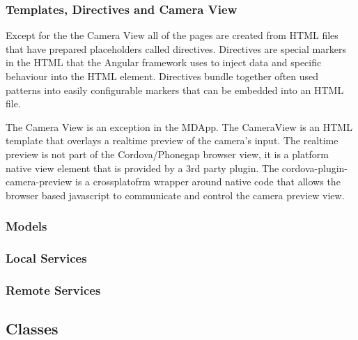 \subsubsection{Templates, Directives and Camera View}
Except for the the Camera View all of the pages are created from HTML files that have prepared placeholders called directives. Directives are special markers in the HTML that the Angular framework uses to inject data and specific behaviour into the HTML element. Directives bundle together often used patterns into easily configurable markers that can be embedded into an HTML file.

The Camera View is an exception in the MDApp. The CameraView is an HTML template that overlays a realtime preview of the camera’s input. The realtime preview is not part of the Cordova/Phonegap browser view, it is a platform native view element that is provided by a 3rd party plugin. The cordova-plugin-camera-preview is a crossplatofrm wrapper around native code that allows the browser based javascript to communicate and control the camera preview view.

\subsubsection{Models}


\subsubsection{Local Services}
\subsubsection{Remote Services}

\subsection{Classes}